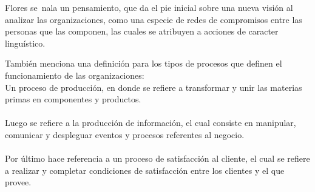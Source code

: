 \begin{itemize}
Flores se~nala un pensamiento, que da el pie inicial sobre una nueva visi\'on al analizar las organizaciones, como una especie de redes de compromisos entre las personas que las componen, las cuales se atribuyen a acciones de caracter lingu\'istico.

Tambi\'en menciona una definici\'on para los tipos de procesos que definen el funcionamiento de las organizaciones: \\

Un proceso de producci\'on, en donde se refiere a transformar y unir las materias primas en componentes y productos. \\ \\
Luego se refiere a la producci\'on de informaci\'on, el cual consiste en manipular, comunicar y despleguar eventos y procesos referentes al negocio. \\ \\
Por \'ultimo hace referencia a un proceso de satisfacci\'on al cliente, el cual se refiere a realizar y completar condiciones de satisfacci\'on entre los clientes y el que provee.

\end{itemize}
\vspace{5cm}
